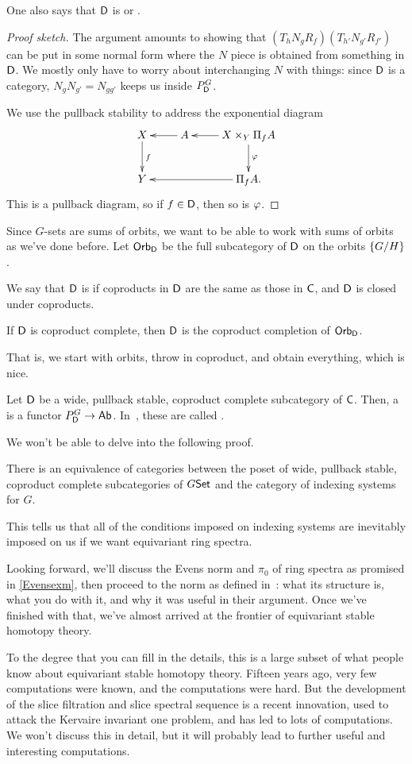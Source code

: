 One also says that $\mathsf D$ is  or .
\begin{proof}[Proof sketch]
The argument amounts to showing that $(T_h N_g R_f)(T_{h'}N_{g'}R_{f'})$ can be put in some normal form where the
$N$ piece is obtained from something in $\mathsf D$. We mostly only have to worry about interchanging $N$ with things:
since $\mathsf D$ is a category, $N_gN_{g'} = N_{gg'}$ keeps us inside $P_\mathsf D^G$.

We use the pullback stability to address the exponential diagram
\[\xymatrix{
	X\ar[d]^f & A\ar[l] & X\times_Y\Pi_fA\ar[d]^\vp\ar[l]\\
	Y && \Pi_f A.\ar[ll]
}\]
This is a pullback diagram, so if $f\in\mathsf D$, then so is $\varphi$.
\end{proof}
Since $G$-sets are sums of orbits, we want to be able to work with sums of orbits as we've done before. Let
$\mathsf{Orb}_\mathsf D$ be the full subcategory of $\mathsf D$ on the orbits $\{G/H\}$.
\begin{defn}
We say that $\mathsf D$ is  if coproducts in $\mathsf D$ are the same as those in $\mathsf C$, and $\mathsf D$ is
closed under coproducts.
\end{defn}
\begin{lem}
If $\mathsf D$ is coproduct complete, then $\mathsf D$ is the coproduct completion of $\mathsf{Orb}_\mathsf D$.
\end{lem}
That is, we start with orbits, throw in coproduct, and obtain everything, which is nice.
\begin{defn}
Let $\mathsf D$ be a wide, pullback stable, coproduct complete subcategory of $\mathsf C$. Then, a 
is a functor $P_\mathsf D^G\to\mathsf{Ab}$. In~\cite{BlumbergHill}, these are called .
\end{defn}
We won't be able to delve into the following proof.
\begin{thm}
There is an equivalence of categories between the poset of wide, pullback stable, coproduct complete subcategories
of $G\mathsf{Set}$ and the category of indexing systems for $G$.
\end{thm}
This tells us that all of the conditions imposed on indexing systems are inevitably imposed on us if we want
equivariant ring spectra.

Looking forward, we'll discuss the Evens norm and $\pi_0$ of ring spectra as promised in \cref{Evensexm}, then
proceed to the norm as defined in~\cite{HHR}: what its structure is, what you do with it, and why it was useful in
their argument. Once we've finished with that, we've almost arrived at the frontier of equivariant stable homotopy
theory.

To the degree that you can fill in the details, this is a large subset of what people know about equivariant stable
homotopy theory. Fifteen years ago, very few computations were known, and the computations were hard. But the
development of the slice filtration and slice spectral sequence is a recent innovation, used to attack the Kervaire
invariant one problem, and has led to lots of computations. We won't discuss this in detail, but it will probably
lead to further useful and interesting computations.
